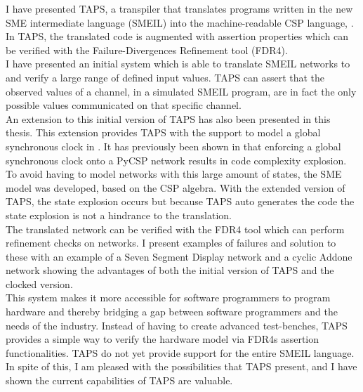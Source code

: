 I have presented TAPS, a transpiler that translates programs written in the
new SME intermediate language (SMEIL) into the machine-readable CSP language,
\cspm{}. In TAPS, the translated \cspm{} code is augmented with assertion
properties which can be verified with the Failure-Divergences Refinement tool
(FDR4).\\
I have presented an initial system which is able to translate SMEIL networks to
\cspm{} and verify a large range of defined input values. TAPS can assert that
the observed values of a channel, in a simulated SMEIL program, are in fact the
only possible values communicated on that specific channel. \\

An extension to this initial version of TAPS has also been presented in this
thesis. This extension provides TAPS with the support to model a global
synchronous clock in \cspm{}. It has previously been shown in \cite{Skaarup14}
that enforcing a global synchronous clock onto a PyCSP network results in code complexity explosion. To avoid having to model networks with this large amount of
states, the SME model was developed, based on the CSP algebra. With the
extended version of TAPS, the state explosion occurs but because TAPS auto
generates the \cspm{} code the state explosion is not a hindrance to the
translation.\\

The translated \cspm{} network can be verified with the FDR4 tool which can
perform refinement checks on \cspm{} networks. I present examples of failures
and solution to these with an example of a Seven Segment Display network and a
cyclic Addone network showing the advantages of both the initial version of TAPS and the clocked version.\\

This system makes it more accessible for software programmers to program
hardware and thereby bridging a gap between software programmers and the needs
of the industry.
Instead of having to create advanced test-benches, TAPS provides a simple
way to verify the hardware model via FDR4s assertion functionalities.
TAPS do not yet provide support for the entire SMEIL language. In spite of this,
I am pleased with the possibilities that TAPS present, and I have shown the current capabilities of TAPS are valuable.



